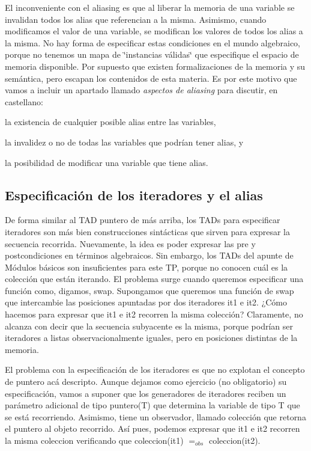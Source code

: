 El inconveniente con el aliasing es que al liberar la memoria de una variable se invalidan todos los alias que referencian a la misma. Asimismo, cuando modificamos el valor de una variable, se modifican los valores de todos los alias a la misma. No hay forma de especificar estas condiciones en el mundo algebraico, porque no tenemos un mapa de \char`\"{}instancias válidas\char`\"{} que especifique el espacio de memoria disponible. Por supuesto que existen formalizaciones de la memoria y su semántica, pero escapan los contenidos de esta materia. Es por este motivo que vamos a incluir un apartado llamado {\itshape aspectos de aliasing} para discutir, en castellano\+:
\begin{DoxyItemize}
\item la existencia de cualquier posible alias entre las variables,
\item la invalidez o no de todas las variables que podrían tener alias, y
\item la posibilidad de modificar una variable que tiene alias.
\end{DoxyItemize}\hypertarget{Aliasing_sec-iteradores}{}\subsection{Especificación de los iteradores y el alias}\label{Aliasing_sec-iteradores}
De forma similar al T\+AD puntero de más arriba, los T\+A\+Ds para especificar iteradores son más bien construcciones sintácticas que sirven para expresar la secuencia recorrida. Nuevamente, la idea es poder expresar las pre y postcondiciones en términos algebraicos. Sin embargo, los T\+A\+Ds del apunte de Módulos básicos son insuficientes para este TP, porque no conocen cuál es la colección que están iterando. El problema surge cuando queremos especificar una función como, digamos, swap. Supongamos que queremos una función de swap que intercambie las posiciones apuntadas por dos iteradores {\ttfamily it1} e {\ttfamily it2}. ¿\+Cómo hacemos para expresar que {\ttfamily it1} e {\ttfamily it2} recorren la misma colección? Claramente, no alcanza con decir que la secuencia subyacente es la misma, porque podrían ser iteradores a listas observacionalmente iguales, pero en posiciones distintas de la memoria.

El problema con la especificación de los iteradores es que no explotan el concepto de puntero acá descripto. Aunque dejamos como ejercicio (no obligatorio) su especificación, vamos a suponer que los generadores de iteradores reciben un parámetro adicional de tipo puntero(\+T) que determina la variable de tipo T que se está recorriendo. Asimismo, tiene un observador, llamado colección que retorna el puntero al objeto recorrido. Así pues, podemos expresar que {\ttfamily it1} e {\ttfamily it2} recorren la misma coleccion verificando que coleccion({\ttfamily it1}) $=_{obs}$ coleccion({\ttfamily it2}). 
